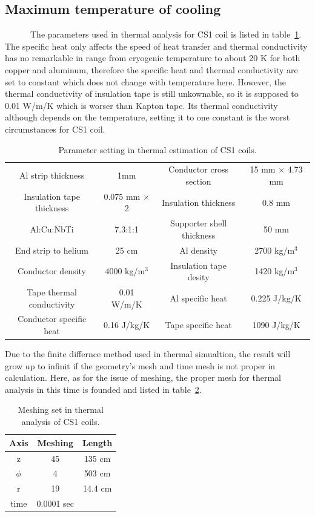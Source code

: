   \subsection{Maximum temperature of cooling}
~~~~~~The parameters used in thermal analysis for CS1 coil is listed in table~\ref{para}.
The specific heat only affects the speed of heat transfer and thermal conductivity has no remarkable in range from cryogenic temperature to about 20 K for both copper and aluminum, therefore the specific heat and thermal conductivity are set to constant which does not change with temperature here.
However, the thermal conductivity of insulation tape is still unkownable, so it is supposed to 0.01 W/m/K which is worser than Kapton tape.
Its thermal conductivity although depends on the temperature, setting it to one constant is the worst circumstances for CS1 coil.
 \begin{table}[H]
  \centering
  \begin{tabular}{cccc} \hline \hline
   Al strip thickness & 1mm & Conductor cross section & 15 mm $\times$ 4.73 mm \\
   Insulation tape thickness & 0.075 mm $\times$ 2 & Insulation thickness & 0.8 mm \\
   Al:Cu:NbTi & 7.3:1:1 & Supporter shell thickness & 50 mm \\
   End strip to helium & 25 cm & Al density & 2700 kg/m$^3$ \\
   Conductor density & 4000 kg/m$^3$ & Insulation tape desity & 1420 kg/m$^3$ \\
   Tape thermal conductivity & 0.01 W/m/K & Al specific heat & 0.225 J/kg/K \\
   Conductor specific heat & 0.16 J/kg/K & Tape specific heat & 1090 J/kg/K \\ \hline \hline
  \end{tabular}
 \caption{Parameter setting in thermal estimation of CS1 coils.}
 \label{para}
 \end{table}
Due to the finite differnce method used in thermal simualtion, the result will grow up to infinit if the geometry's mesh and time mesh is not proper in calculation.
Here, as for the issue of meshing, the proper mesh for thermal analysis in this time is founded and listed in table~\ref{4mesh}.
 \begin{table}[H]
  \centering
  \begin{tabular}{ccc} \hline \hline
   Axis & Meshing & Length \\ \hline
   z & 45 & 135 cm \\
   $\phi$ & 4 & 503 cm \\
   r & 19 & 14.4 cm \\
   time & 0.0001 sec & \\ \hline \hline
  \end{tabular}
  \caption{Meshing set in thermal analysis of CS1 coils.}
  \label{4mesh}
 \end{table}
